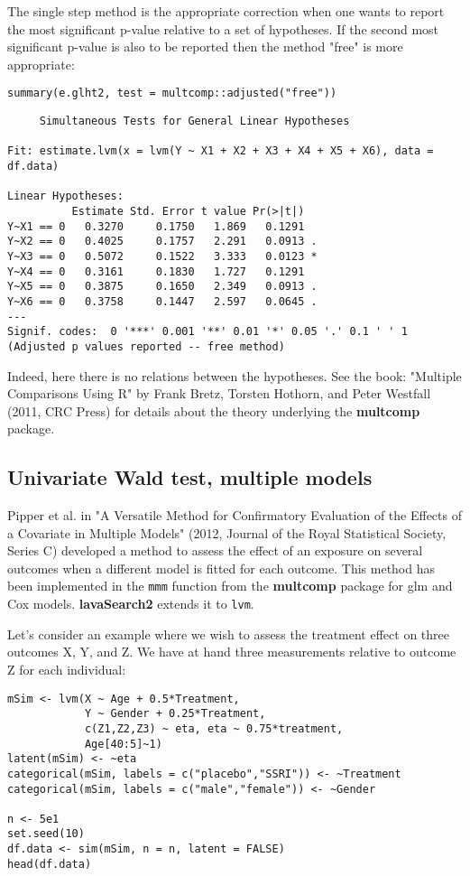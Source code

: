 \documentclass[12pt]{article}
\begin{document}
The single step method is the appropriate correction when one wants to
report the most significant p-value relative to a set of
hypotheses. If the second most significant p-value is also to be
reported then the method "free" is more appropriate:
\lstset{language=r,label= ,caption= ,captionpos=b,numbers=none}
\begin{lstlisting}
summary(e.glht2, test = multcomp::adjusted("free"))
\end{lstlisting}

\begin{verbatim}
	 Simultaneous Tests for General Linear Hypotheses

Fit: estimate.lvm(x = lvm(Y ~ X1 + X2 + X3 + X4 + X5 + X6), data = df.data)

Linear Hypotheses:
          Estimate Std. Error t value Pr(>|t|)  
Y~X1 == 0   0.3270     0.1750   1.869   0.1291  
Y~X2 == 0   0.4025     0.1757   2.291   0.0913 .
Y~X3 == 0   0.5072     0.1522   3.333   0.0123 *
Y~X4 == 0   0.3161     0.1830   1.727   0.1291  
Y~X5 == 0   0.3875     0.1650   2.349   0.0913 .
Y~X6 == 0   0.3758     0.1447   2.597   0.0645 .
---
Signif. codes:  0 '***' 0.001 '**' 0.01 '*' 0.05 '.' 0.1 ' ' 1
(Adjusted p values reported -- free method)
\end{verbatim}
Indeed, here there is no relations between the hypotheses. See the
book: "Multiple Comparisons Using R" by Frank Bretz, Torsten Hothorn,
and Peter Westfall (2011, CRC Press) for details about the theory
underlying the \textbf{multcomp} package.

\subsection{Univariate Wald test, multiple models}
\label{sec:orga0473a2}

Pipper et al. in "A Versatile Method for Confirmatory Evaluation of
the Effects of a Covariate in Multiple Models" (2012, Journal of the
Royal Statistical Society, Series C) developed a method to assess the
effect of an exposure on several outcomes when a different model is
fitted for each outcome. This method has been implemented in the \texttt{mmm}
function from the \textbf{multcomp} package for glm and Cox
models. \textbf{lavaSearch2} extends it to \texttt{lvm}. 

Let's consider an example where we wish to assess the treatment effect
on three outcomes X, Y, and Z. We have at hand three measurements
relative to outcome Z for each individual:
\lstset{language=r,label= ,caption= ,captionpos=b,numbers=none}
\begin{lstlisting}
mSim <- lvm(X ~ Age + 0.5*Treatment,
			Y ~ Gender + 0.25*Treatment,
			c(Z1,Z2,Z3) ~ eta, eta ~ 0.75*treatment,
			Age[40:5]~1)
latent(mSim) <- ~eta
categorical(mSim, labels = c("placebo","SSRI")) <- ~Treatment
categorical(mSim, labels = c("male","female")) <- ~Gender

n <- 5e1
set.seed(10)
df.data <- sim(mSim, n = n, latent = FALSE)
head(df.data)
\end{lstlisting}
\end{document}
